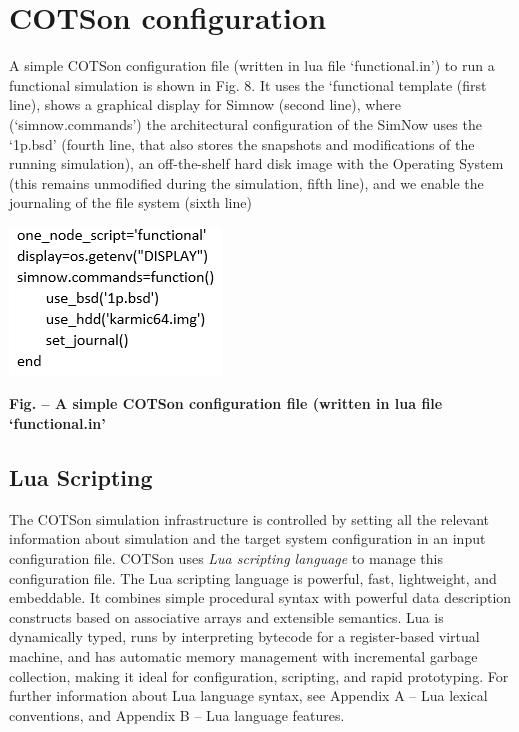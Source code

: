 \documentclass[a4paper]{article}
\newcounter{Figure}
\renewcommand\theFigure{\arabic{Figure}}
\begin{document}
\section[COTSon configuration]{COTSon configuration}
{
A simple COTSon configuration file (written in lua file
{\textquoteleft}functional.in{\textquoteright}) to run a functional
simulation is shown in Fig. 8. It uses the {\textquoteleft}functional
template (first line), shows a graphical display for Simnow (second
line), where ({\textquoteleft}simnow.commands{\textquoteright}) the
architectural configuration of the SimNow uses the
{\textquoteleft}1p.bsd{\textquoteright} (fourth line, that also stores
the snapshots and modifications of the running simulation), an
off-the-shelf hard disk image with the Operating System (this remains
unmodified during the simulation, fifth line), and we enable the
journaling of the file system (sixth line)}

{\centering 
\includegraphics[width=2.2189in,height=1.552in]{img8.png}
\par}

{\centering{}\sffamily\bfseries
\label{bkm:Ref388172416}Fig.
\stepcounter{Figure}{\theFigure} -- A simple COTSon configuration file
(written in lua file {\textquoteleft}functional.in{\textquoteright}
\par}

\subsection[Lua Scripting]{ Lua Scripting}
{
The COTSon simulation infrastructure is controlled by setting all the
relevant information about simulation and the target system
configuration in an input configuration file. COTSon uses \textit{Lua
scripting language} to manage this configuration file. The Lua
scripting language is powerful, fast, lightweight, and embeddable. It
combines simple procedural syntax with powerful data description
constructs based on associative arrays and extensible semantics. Lua is
dynamically typed, runs by interpreting bytecode for a register-based
virtual machine, and has automatic memory management with incremental
garbage collection, making it ideal for configuration, scripting, and
rapid prototyping. For further information about Lua language syntax,
see Appendix A -- Lua lexical conventions, and Appendix B -- Lua
language features.}
\end{document}
